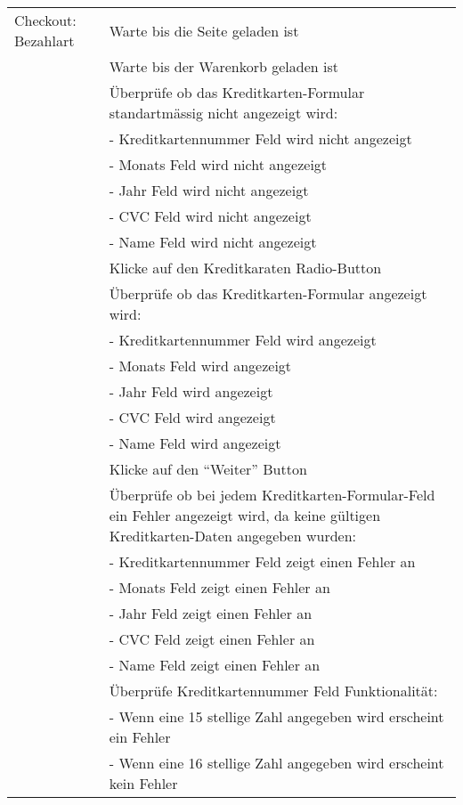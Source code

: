 \begin{table}[H]
\begin{tabularx}{0.9\textwidth}{ | l | X | }
		\multirow{1}{*}{Checkout: Bezahlart} & Warte bis die Seite geladen ist \\ \cline{2-2}
		& Warte bis der Warenkorb geladen ist \\ \cline{2-2}
		& Überprüfe ob das Kreditkarten-Formular standartmässig nicht angezeigt wird: \\ \cline{2-2}
		& - Kreditkartennummer Feld wird nicht angezeigt \\ \cline{2-2}
		& - Monats Feld wird nicht angezeigt \\ \cline{2-2}
		& - Jahr Feld wird nicht angezeigt \\ \cline{2-2}
		& - CVC Feld wird nicht angezeigt \\ \cline{2-2}
		& - Name Feld wird nicht angezeigt \\ \cline{2-2}
		& Klicke auf den Kreditkaraten Radio-Button \\ \cline{2-2}
		& Überprüfe ob das Kreditkarten-Formular angezeigt wird: \\ \cline{2-2}
		& - Kreditkartennummer Feld wird angezeigt \\ \cline{2-2}
		& - Monats Feld wird angezeigt \\ \cline{2-2}
		& - Jahr Feld wird angezeigt \\ \cline{2-2}
		& - CVC Feld wird angezeigt \\ \cline{2-2}
		& - Name Feld wird angezeigt \\ \cline{2-2}
		& Klicke auf den "`Weiter"' Button \\ \hline
		& Überprüfe ob bei jedem Kreditkarten-Formular-Feld ein Fehler angezeigt wird, da keine gültigen Kreditkarten-Daten angegeben wurden: \\ \cline{2-2}
		& - Kreditkartennummer Feld zeigt einen Fehler an \\ \cline{2-2}
		& - Monats Feld zeigt einen Fehler an \\ \cline{2-2}
		& - Jahr Feld zeigt einen Fehler an \\ \cline{2-2}
		& - CVC Feld zeigt einen Fehler an \\ \cline{2-2}
		& - Name Feld zeigt einen Fehler an \\ \cline{2-2}
		& Überprüfe Kreditkartennummer Feld Funktionalität: \\ \cline{2-2}
		& - Wenn eine 15 stellige Zahl angegeben wird erscheint ein Fehler \\ \cline{2-2}
		& - Wenn eine 16 stellige Zahl angegeben wird erscheint kein Fehler \\ \cline{2-2}

\end{tabularx}
\end{table}
